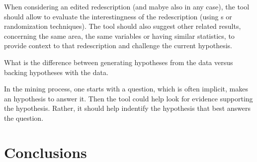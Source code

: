 \documentclass{llncs}
\begin{document}
When considering an edited redescription (and mabye also in any case), the tool should allow to evaluate the interestingness of the redescription (using \pValue{}s or randomization techniques). The tool should also suggest other related results, concerning the same area, the same variables or having similar statistics, to provide context to that redescription and challenge the current hypothesis.

What is the difference between generating hypotheses from the data versus backing hypotheses with the data.

In the mining process, one starts with a question, which is often implicit, makes an hypothesis to answer it. Then the tool could help look for evidence supporting the hypothesis. Rather, it should help indentify the hypothesis that best answers the question.  

\section{Conclusions}


%

  
\end{document}

